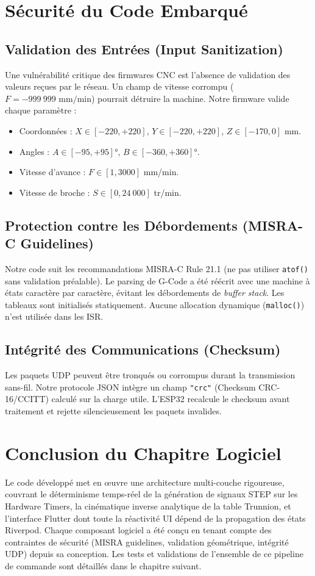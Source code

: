\section{Sécurité du Code Embarqué}

\subsection{Validation des Entrées (Input Sanitization)}
Une vulnérabilité critique des firmwares CNC est l'absence de validation des valeurs reçues par le réseau. Un champ de vitesse corrompu ($F = -999~999 \text{ mm/min}$) pourrait détruire la machine. Notre firmware valide chaque paramètre :

\begin{itemize}
    \item Coordonnées : $X \in [-220, +220]$, $Y \in [-220, +220]$, $Z \in [-170, 0]$ mm.
    \item Angles : $A \in [-95, +95]°$, $B \in [-360, +360]°$.
    \item Vitesse d'avance : $F \in [1, 3000]$ mm/min.
    \item Vitesse de broche : $S \in [0, 24~000]$ tr/min.
\end{itemize}

\subsection{Protection contre les Débordements (MISRA-C Guidelines)}
Notre code suit les recommandations MISRA-C Rule 21.1 (ne pas utiliser \texttt{atof()} sans validation préalable). Le parsing de G-Code a été réécrit avec une machine à états caractère par caractère, évitant les débordements de \textit{buffer stack}. Les tableaux sont initialisés statiquement. Aucune allocation dynamique (\texttt{malloc()}) n'est utilisée dans les ISR.

\subsection{Intégrité des Communications (Checksum)}
Les paquets UDP peuvent être tronqués ou corrompus durant la transmission sans-fil. Notre protocole JSON intègre un champ \texttt{"crc"} (Checksum CRC-16/CCITT) calculé sur la charge utile. L'ESP32 recalcule le checksum avant traitement et rejette silencieusement les paquets invalides.

\section{Conclusion du Chapitre Logiciel}
Le code développé met en œuvre une architecture multi-couche rigoureuse, couvrant le déterminisme temps-réel de la génération de signaux STEP sur les Hardware Timers, la cinématique inverse analytique de la table Trunnion, et l'interface Flutter dont toute la réactivité UI dépend de la propagation des états Riverpod. Chaque composant logiciel a été conçu en tenant compte des contraintes de sécurité (MISRA guidelines, validation géométrique, intégrité UDP) depuis sa conception. Les tests et validations de l'ensemble de ce pipeline de commande sont détaillés dans le chapitre suivant.
